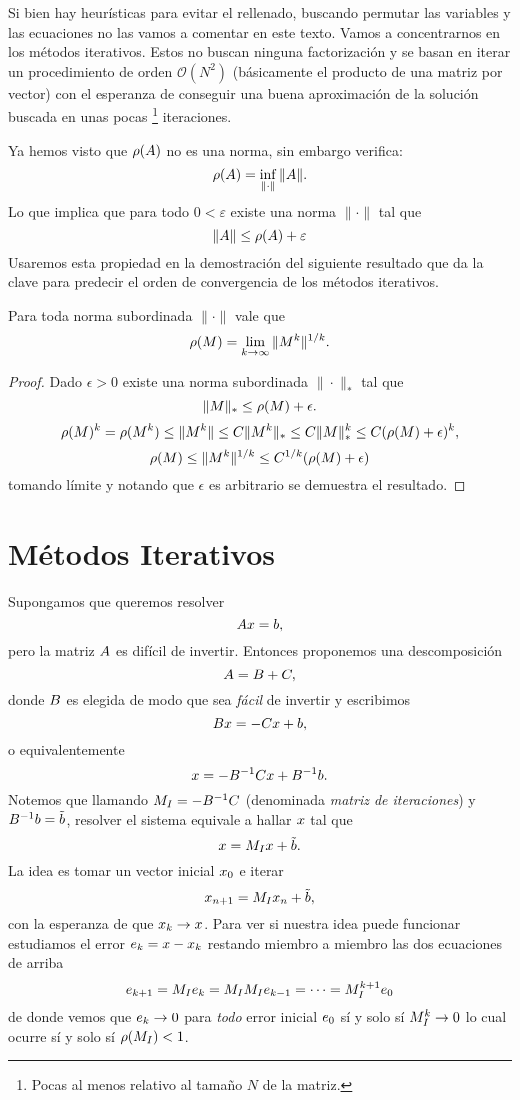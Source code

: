 Si bien hay heurísticas para evitar el rellenado, buscando permutar las variables y las ecuaciones no las vamos a comentar en este texto. Vamos a concentrarnos en los métodos iterativos. Estos no buscan ninguna factorización y se basan en iterar un procedimiento de orden $\mathcal{O}(N^2)$ (básicamente el producto de una matriz por vector)  con el esperanza de conseguir una buena aproximación de la solución buscada en unas pocas \footnote{Pocas al menos relativo al tamaño $N$ de la matriz.} iteraciones. 

Ya hemos visto que $\rho(\Ab)$ no es una norma, sin embargo verifica:
$$
\rho(\Ab)=\inf_{\|\cdot\|} \|\Ab\|.
$$
Lo que implica que para todo $0<\varepsilon$ existe una norma $\|\cdot\|$ tal que
$$\|\Ab\|\le \rho(\Ab)+ \varepsilon$$ Usaremos esta propiedad en la demostración del siguiente resultado que da la clave para predecir el orden de convergencia de los métodos iterativos.
\tcc
\begin{prop}
 Para toda norma subordinada $\|\cdot\|$ vale que
 $$
 \rho(\Mb)=\lim_{k\to \infty} \|\Mb^k\|^{1/k}.
 $$
\end{prop}

\etcc


\begin{proof}
 Dado $\epsilon>0$ existe una norma subordinada $\|\cdot\|_{*}$ tal que
 $$
 \|\Mb\|_{*}\le \rho(\Mb)+\epsilon.
 $$
 $$
 \rho(\Mb)^k=\rho(\Mb^k)\le \|\Mb^k\|\le C \|\Mb^k\|_{*}\le C \|\Mb\|^k_{*}\le C(\rho(\Mb)+\epsilon)^k,
 $$
 $$
 \rho(\Mb)\le \|\Mb^k\|^{1/k}\le C^{1/k}(\rho(\Mb)+\epsilon)
 $$
 tomando límite y notando que $\epsilon$ es arbitrario se demuestra el resultado.
\end{proof}
\section{Métodos Iterativos}
Supongamos que queremos resolver
$$
\Ab\xb=\bb,
$$
pero la matriz $\Ab$ es difícil de invertir. Entonces proponemos una descomposición
$$\Ab=\Bb+\Cb,$$
donde $\Bb$ es elegida de modo que sea \emph{fácil} de invertir y escribimos
$$
\Bb\xb=-\Cb\xb+\bb,
$$
o equivalentemente
$$
\xb=-\Bb^{-1}\Cb\xb+\Bb^{-1}\bb.
$$
Notemos que llamando $\Mb_I=-\Bb^{-1}\Cb$  (denominada \emph{matriz de iteraciones}) y $\Bb^{-1}\bb=\tilde{\bb}$,  resolver el sistema equivale a hallar $\xb$ tal que
$$
\xb=\Mb_I\xb+\tilde{\bb}.
$$
La idea es tomar un vector inicial $\xb_0$ e iterar
$$
\xb_{n+1}=\Mb_I\xb_n+\tilde{\bb},
$$
con la esperanza de que $\xb_k\to \xb$. Para ver si nuestra idea puede funcionar estudiamos el error $\eb_k=\xb-\xb_k$ restando miembro a miembro las dos ecuaciones de arriba
$$
\eb_{k+1}=\Mb_I\eb_k=\Mb_I\Mb_I\eb_{k-1}=\cdots = \Mb^{k+1}_I\eb_0
$$
de donde vemos que $\eb_k\to \cero$ para \emph{todo} error inicial $\eb_0$ sí y solo sí
$\Mb_I^{k}\to \cero $ lo cual ocurre sí y solo sí $\rho(\Mb_I)<1$.

